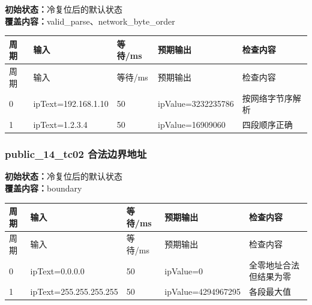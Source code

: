 \noindent\textbf{初始状态：}冷复位后的默认状态\\

\textbf{覆盖内容：}valid\_parse、network\_byte\_order

\begin{longtable}{L{1.0cm}L{4.7cm}L{1.4cm}L{4.0cm}L{2.1cm}}

\toprule

周期 & 输入 & 等待/ms & 预期输出 & 检查内容\\

\midrule

\endfirsthead

\toprule

周期 & 输入 & 等待/ms & 预期输出 & 检查内容\\

\midrule

\endhead

0 & ipText=192.168.1.10 & 50 & ipValue=3232235786 & 按网络字节序解析\\

1 & ipText=1.2.3.4 & 50 & ipValue=16909060 & 四段顺序正确\\

\bottomrule

\end{longtable}

\subsubsection{{\ttfamily public\_14\_tc02} 合法边界地址}

\noindent\textbf{初始状态：}冷复位后的默认状态\\

\textbf{覆盖内容：}boundary

\begin{longtable}{L{1.0cm}L{4.7cm}L{1.4cm}L{4.0cm}L{2.1cm}}

\toprule

周期 & 输入 & 等待/ms & 预期输出 & 检查内容\\

\midrule

\endfirsthead

\toprule

周期 & 输入 & 等待/ms & 预期输出 & 检查内容\\

\midrule

\endhead

0 & ipText=0.0.0.0 & 50 & ipValue=0 & 全零地址合法但结果为零\\

1 & ipText=255.255.255.255 & 50 & ipValue=4294967295 & 各段最大值\\

\bottomrule

\end{longtable}

